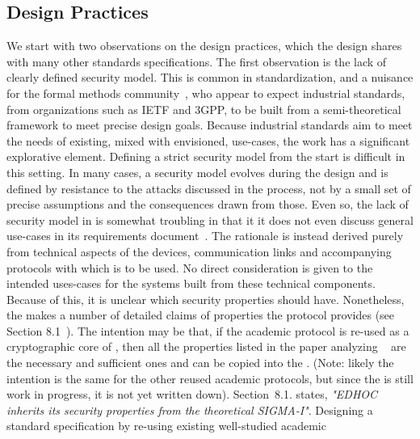 \documentclass[runningheads,draft]{llncs}
\begin{document}
\subsection{Design Practices}
\label{sec:designPractices}
We start with two observations on the design practices, which the \mEdhoc{}
design shares with many other standards specifications.
%
The first observation is the lack of clearly defined security model.
%
This is common in standardization, and a nuisance for the formal methods
community~\cite{DBLP:conf/ccs/BasinDHRSS18}, who appear to expect industrial
standards, from organizations such as IETF and 3GPP, to be built from a
semi-theoretical framework to meet precise design goals.
%
Because industrial standards aim to meet the needs of
existing, mixed with envisioned, use-cases, the work has a significant
explorative element.
%
Defining a strict security model from the start is difficult in this setting.
%
In many cases, a security model evolves during the design and is defined
by resistance to the attacks discussed in the process, not by a small set of
precise assumptions and the consequences drawn from those.
%
Even so, the lack of security model in \mEdhoc{} is somewhat troubling in that
it it does not even discuss general use-cases in its requirements
document~\cite{ietf-lake-reqs-04}.
%
The rationale is instead derived purely from technical aspects of the devices,
communication links and accompanying protocols with which \mEdhoc{} is to be used.
%
No direct consideration is given to the intended uses-cases for the systems
built from these technical components.
%
Because of this, it is unclear which security properties \mEdhoc{} should have.
%
Nonetheless, the \mSpec{} makes a number of detailed claims of properties
the protocol provides (see Section 8.1~\cite{selander-lake-edhoc-01}).
%
The intention may be that, if the academic protocol \mSigma{} is re-used as a
cryptographic core of \mEdhoc, then all the properties listed
in the paper analyzing \mSigma~\cite{DBLP:conf/crypto/CanettiK02} are the
necessary and sufficient ones and can be copied into the \mSpec.
%
(Note: likely the intention is the same for the other reused academic protocols,
but since the \mSpec{} is still work in progress, it is not yet written
down).
%
Section~8.1. states, \emph{"EDHOC inherits its security properties
from the theoretical SIGMA-I"}.
%
Designing a standard specification by re-using existing well-studied academic
\end{document}
